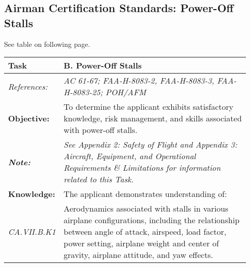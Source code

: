 {\subsection{Airman Certification Standards: Power-Off Stalls}

See table on following page.

\begin{table}[]
\begin{tabular}%
  {>{\raggedleft\arraybackslash}p{0.15\linewidth}%
   >{\raggedright\arraybackslash}p{0.8\linewidth}%
  }
\textbf{Task}                                                       & \textbf{B. Power-Off Stalls}                                                                                                                                                                                                                 \\ \hline
\textit{References:}                                                & \textit{AC 61-67; FAA-H-8083-2, FAA-H-8083-3, FAA-H-8083-25; POH/AFM}                                                                                                                                                                        \\
\textbf{Objective:}                                                 & To determine the applicant exhibits satisfactory knowledge, risk management, and skills associated with power-off stalls.                                                                                                                    \\
\textit{\textbf{Note:}}                                             & \textit{See Appendix 2: Safety of Flight and Appendix 3: Aircraft, Equipment, and Operational Requirements \& Limitations for information related to this Task.}                                                                             \\ \hline
\textbf{Knowledge:}                                                 & The applicant demonstrates understanding of:                                                                                                                                                                                                 \\
\textit{CA.VII.B.K1}                                                & Aerodynamics associated with stalls in various airplane configurations, including the relationship between angle of attack, airspeed, load factor, power setting, airplane weight and center of gravity, airplane attitude, and yaw effects. \\

\end{tabular}
\end{table}}
